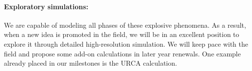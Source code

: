 \paragraph{Exploratory simulations: }
%
We are
capable of modeling all phases of these explosive phenomena.  As a
result, when a new idea is promoted in the field, we will be in an
excellent position to explore it through detailed high-resolution
simulation.  We will keep pace with the field and propose some add-on
calculations in later year renewals.  One example already placed in
our milestones is the URCA calculation.



